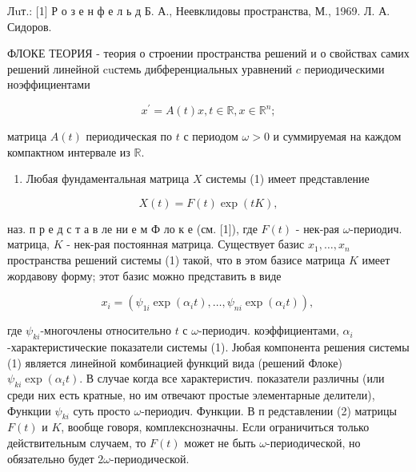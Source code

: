 \documentclass[10pt]{article}
\begin{document}
Лuт.: [1] Р о з е н ф е л ь д Б. А., Неевклидовы пространства, М., 1969. Л. А. Сидоров.



ФЛОКЕ ТЕОРИЯ - теория о строении пространства решений и о свойствах самих решений линейной cuстемь дибференциальных уравнений $c$ периодическими ноэффициентами



\[

x^{\prime}=A(t) x, t \in \mathbb{R}, x \in \mathbb{R}^{n} ;

\]



матрица $A(t)$ периодическая по $t$ с периодом $\omega>0$ и суммируемая на каждом компактном интервале из $\mathbb{R}$.



\begin{enumerate}

  \item Любая фундаментальная матрица $X$ системы (1) имеет представление

\end{enumerate}



\[

X(t)=F(t) \exp (t K),

\]



наз. п р е д с т а в ле ни е м Ф ло к е (см. [1]), где $F(t)$ - нек-рая $\omega$-периодич. матрица, $K$ - нек-рая постоянная матрица. Существует базис $x_{1}, \ldots, x_{n}$ пространства решений системы (1) такой, что в этом базисе матрица $K$ имеет жордавову форму; этот базис можно представить в виде



\[

x_{i}=\left(\psi_{1 i} \exp \left(\alpha_{i} t\right), \ldots, \psi_{n i} \exp \left(\alpha_{i} t\right)\right) \text {, }

\]



где $\psi_{k i}$-многочлены относительно $t$ с $\omega$-периодич. коэффициентами, $\alpha_{i}$-характеристические показатели системы (1). Јюбая компонента решения системы (1) является линейной комбинацией функций вида (решений Флоке) $\psi_{k i} \exp \left(\alpha_{i} t\right)$. В случае когда все характеристич. показатели различны (или среди них есть кратные, но им отвечают простые элементарные делители), Функции $\psi_{k i}$ суть просто $\omega$-периодич. Функции. В п редставлении (2) матрицы $F(t)$ и $K$, вообще говоря, комплекснозначны. Если ограничиться только действительным случаем, то $F(t)$ может не быть $\omega$-периодической, но обязательно будет $2 \omega$-периодической.
\end{document}
